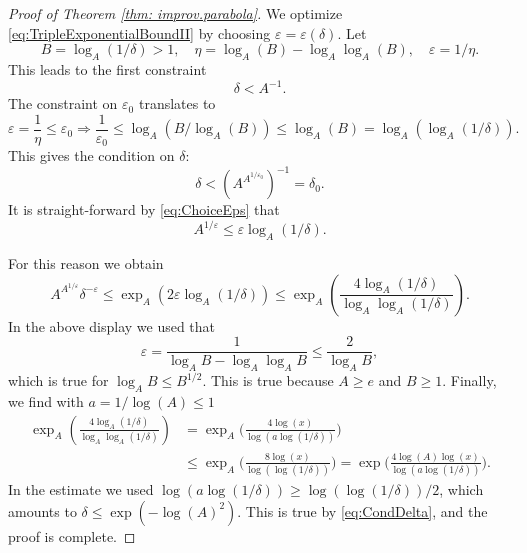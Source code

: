 \begin{proof}[Proof of Theorem \ref{thm: improv.parabola}]
We optimize \eqref{eq:TripleExponentialBoundII} by choosing $\varepsilon=\varepsilon(\delta)$. 
Let 
\begin{equation}
\label{eq:ChoiceEps}
B = \log_A(1/\delta) > 1, \quad \eta = \log_A (B) - \log_A \log_A(B), \quad \varepsilon = 1/\eta.
\end{equation}
 This leads to the first constraint
\begin{equation}
\label{eq:ConstraintI}
\delta < A^{-1}.
\end{equation}
The constraint on $\varepsilon_0$ translates to
\begin{equation*}
\varepsilon = \frac{1}{\eta} \leq \varepsilon_0 \Rightarrow \frac{1}{\varepsilon_0} \leq \log_A (B / \log_A (B)) \leq \log_A( B) = \log_A (\log_A (1/\delta)).
\end{equation*}
This gives the condition on $\delta$:
\begin{equation}
\label{eq:CondDelta}
\delta < (A^{A^{1/\varepsilon_0}})^{-1} = \delta_0.
\end{equation}
It is straight-forward by \eqref{eq:ChoiceEps} that
\begin{equation*}
A^{1/\varepsilon} \leq \varepsilon \log_A(1/\delta).
\end{equation*}

For this reason we obtain
\begin{equation*}
A^{A^{1/\varepsilon}} \delta^{-\varepsilon} \leq \exp_A (2 \varepsilon \log_A(1/\delta)) \leq \exp_A( \frac{4 \log_A(1/\delta)}{\log_A \log_A (1/\delta)}).
\end{equation*}
In the above display we used that
\begin{equation*}
\varepsilon = \frac{1}{\log_A B - \log_A \log_A B} \leq \frac{2}{\log_A B},
\end{equation*}
which is true for $\log_A B \leq B^{1/2}$. This is true because $A \geq e$ and $B \geq 1$.
Finally, we find with $a = 1/\log(A) \leq 1$ 
\begin{equation*}
\begin{split}
\exp_A( \frac{4 \log_A(1/\delta)}{\log_A \log_A (1/\delta)}) &= \exp_A \big( \frac{4 \log(x)}{\log( a \log(1/\delta))} \big) \\
&\leq \exp_A \big( \frac{8 \log(x)}{\log( \log(1/\delta))} \big) = \exp \big( \frac{4 \log(A) \log(x)}{\log( a \log(1/\delta))} \big).
\end{split}
\end{equation*}
In the estimate we used $\log(a \log(1/\delta)) \geq \log ( \log( 1/\delta))/2$, which amounts to $\delta \leq \exp( - \log(A)^2)$. This is true by \eqref{eq:CondDelta}, and the proof is complete.

\end{proof}










